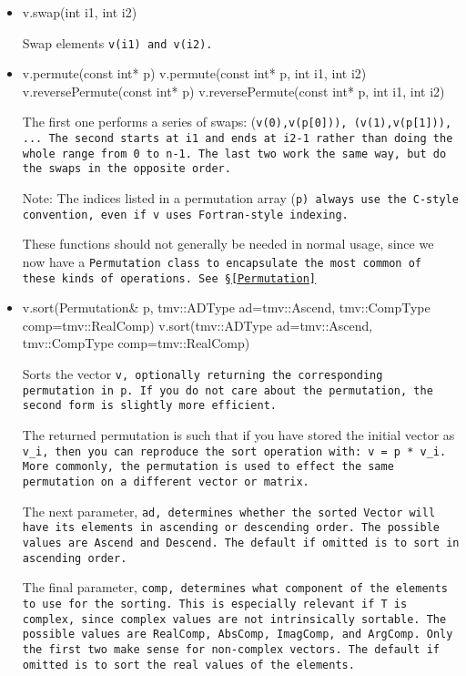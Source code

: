 \begin{itemize}
\item
\begin{tmvcode}
v.swap(int i1, int i2)
\end{tmvcode}
Swap elements \tt{v(i1)} and \tt{v(i2)}.

\item
\begin{tmvcode}
v.permute(const int* p)
v.permute(const int* p, int i1, int i2)
v.reversePermute(const int* p)
v.reversePermute(const int* p, int i1, int i2)
\end{tmvcode}
The first one performs a series of swaps: (\tt{v(0)},\tt{v(p[0])}), (\tt{v(1)},\tt{v(p[1])}), ... 
The second starts at \tt{i1} and ends at \tt{i2-1} rather than
doing the whole range from 0 to \tt{n-1}.
The last two work the same way, but do the swaps in the opposite order.

Note: The indices listed in a permutation array (\tt{p}) always use 
the C-style convention, even if \tt{v} uses Fortran-style indexing.

These functions should not generally be needed in normal usage, since we now 
have a \tt{Permutation} class to encapsulate the most common of these kinds of 
operations.  See \S\ref{Permutation}

\item
\begin{tmvcode}
v.sort(Permutation& p, tmv::ADType ad=tmv::Ascend, 
      tmv::CompType comp=tmv::RealComp)
v.sort(tmv::ADType ad=tmv::Ascend, 
      tmv::CompType comp=tmv::RealComp)
\end{tmvcode}
Sorts the vector \tt{v}, optionally returning the corresponding permutation in \tt{p}.
If you do not care about the permutation, the second form is slightly more efficient.

The returned permutation is such that if you have stored the initial vector as
\tt{v\_i}, then you can reproduce the sort operation with: \tt{v = p * v\_i}.
More commonly, the permutation is used to effect the same permutation on a 
different vector or matrix.

The next parameter, \tt{ad}, determines whether the sorted \tt{Vector} 
will have its elements in ascending or descending order.  The possible values
are \tt{Ascend} and \tt{Descend}.  The default if omitted is to sort
in ascending order.

The final parameter, \tt{comp}, determines what component of the
elements to use for the sorting.  This is especially relevant if T is complex, 
since complex values are not intrinsically sortable.
The possible values are
\tt{RealComp}, \tt{AbsComp},
\tt{ImagComp}, and \tt{ArgComp}.
Only the first two make sense for non-complex vectors.  The default if
omitted is to sort the real values of the elements.  


\end{itemize}

